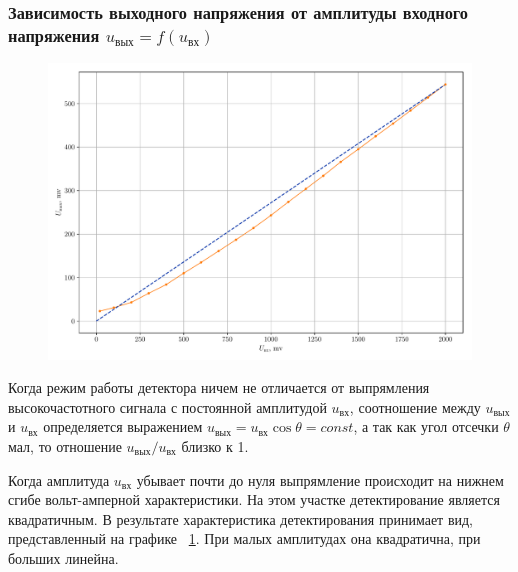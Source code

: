 \subsubsection{Зависимость выходного напряжения от амплитуды входного напряжения $u_\text{вых}=f(u_\text{вх})$}
\begin{figure}[h!]
	\centering
	\includegraphics[width=0.8\linewidth]{plots/exp3a.pdf}
	\caption{}
	\label{exp:3.2}
\end{figure}

Когда режим работы детектора ничем не отличается от выпрямления высокочастотного сигнала с постоянной амплитудой $u_\text{вх}$, соотношение между $u_\text{вых}$ и $u_\text{вх}$ определяется выражением $u_\text{вых}=u_\text{вх}\cos\theta=const$, а так как угол отсечки $\theta$ мал, то отношение $u_\text{вых}/u_\text{вх}$ близко к 1.

Когда амплитуда $u_\text{вх}$ убывает почти до нуля выпрямление происходит на нижнем сгибе вольт-амперной характеристики. На этом участке детектирование является квадратичным. В результате характеристика детектирования принимает вид, представленный на графике ~\ref{exp:3.2}. При малых амплитудах она квадратична, при больших линейна.  
